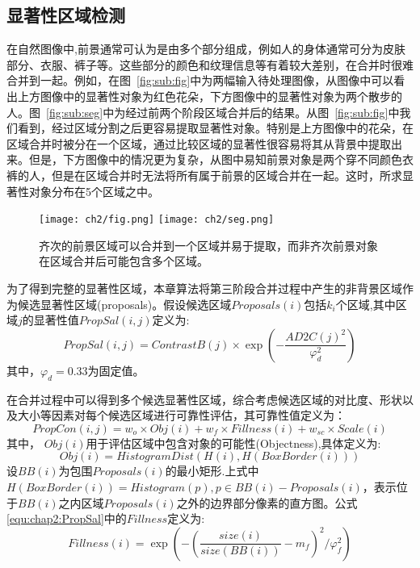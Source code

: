 \par
\subsection{显著性区域检测}
\label{subsec:saliency}

在自然图像中,前景通常可认为是由多个部分组成，例如人的身体通常可分为皮肤部分、衣服、裤子等。这些部分的颜色和纹理信息等有着较大差别，在合并时很难合并到一起。例如，在图~\ref{fig:sub:fig}中为两幅输入待处理图像，从图像中可以看出上方图像中的显著性对象为红色花朵，下方图像中的显著性对象为两个散步的人。图~\ref{fig:sub:seg}中为经过前两个阶段区域合并后的结果。从图~\ref{fig:sub:fig}中我们看到，经过区域分割之后更容易提取显著性对象。特别是上方图像中的花朵，在区域合并时被分在一个区域，通过比较区域的显著性很容易将其从背景中提取出来。但是，下方图像中的情况更为复杂，从图中易知前景对象是两个穿不同颜色衣裤的人，但是在区域合并时无法将所有属于前景的区域合并在一起。这时，所求显著性对象分布在5个区域之中。

\begin{figure}[htb]
  \centering%
    {\texttt{[image: ch2/fig.png]}}%
 \hspace{1em}%
      {\texttt{[image: ch2/seg.png]}}

  \caption{齐次的前景区域可以合并到一个区域并易于提取，而非齐次前景对象在区域合并后可能包含多个区域。}
  \label{fig:fgseg}
\end{figure}

\par
为了得到完整的显著性区域，本章算法将第三阶段合并过程中产生的非背景区域作为候选显著性区域(proposals)。假设候选区域$Proposals(i)$包括$k_i$个区域,其中区域$j$的显著性值$PropSal(i,j)$定义为:
$$
   PropSal(i,j)=ContrastB(j) \times \exp{(-\frac{AD2C(j)^2}{\varphi_d^2 })}
$$
其中，$\varphi_d=0.33$为固定值。\par
在合并过程中可以得到多个候选显著性区域，综合考虑候选区域的对比度、形状以及大小等因素对每个候选区域进行可靠性评估，其可靠性值定义为：
\begin{equation}
   \label{equ:chap2:PropSal}
   PropCon(i,j)=w_o \times Obj(i) + w_f \times Fillness(i) + w_{sc} \times Scale(i)
\end{equation}
其中， $Obj(i)$用于评估区域中包含对象的可能性(Objectness)\cite{objectness},具体定义为:
$$Obj(i) = HistogramDist(H(i),H(BoxBorder(i)))$$
设$BB(i)$为包围$Proposals(i)$的最小矩形.上式中$H(BoxBorder(i))=Histogram(p), p \in BB(i)-Proposals(i)$，表示位于$BB(i)$之内区域$Proposals(i)$之外的边界部分像素的直方图。公式\ref{equ:chap2:PropSal}中的$Fillness$定义为:
$$ Fillness(i) = \exp({-(\frac{size(i)}{size(BB(i))}-m_f)^2}/\varphi_f^2)$$ \par


